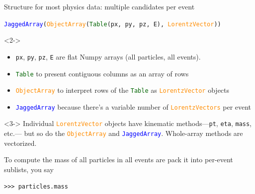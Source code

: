 \documentclass[aspectratio=169]{beamer}
\begin{document}
\begin{frame}[fragile]{Structure for most physics data: multiple candidates per event}
\vspace{0.4 cm}

\begin{center}
{\tt \small \textcolor{blue}{JaggedArray}(\textcolor{darkorange}{ObjectArray}(\textcolor{darkgreen}{Table}(px, py, pz, E), \textcolor{darkorange}{LorentzVector}))}
\end{center}

\begin{uncoverenv}<2->
\begin{itemize}
\item {\tt \small px}, {\tt \small py}, {\tt \small pz}, {\tt \small E} are flat Numpy arrays (all particles, all events).
\item \textcolor{darkgreen}{\tt \small Table} to present contiguous columns as an array of rows
\item \textcolor{darkorange}{\tt \small ObjectArray} to interpret rows of the \textcolor{darkgreen}{\tt \small Table} as \textcolor{darkorange}{\tt \small LorentzVector} objects
\item \textcolor{blue}{\tt \small JaggedArray} because there's a variable number of \textcolor{darkorange}{\tt \small LorentzVectors} per event
\end{itemize}
\end{uncoverenv}

\begin{uncoverenv}<3->
\vspace{0.35 cm}
Individual \textcolor{darkorange}{\tt \small LorentzVector} objects have kinematic methods---{\tt \small pt}, {\tt \small eta}, {\tt \small mass}, etc.--- but so do the \textcolor{darkorange}{\tt \small ObjectArray} and \textcolor{blue}{\tt \small JaggedArray}. Whole-array methods are vectorized.

\vspace{0.25 cm}
To compute the mass of all particles in all events are pack it into per-event sublists, you say

\small\begin{verbatim}
>>> particles.mass
\end{verbatim}
\end{uncoverenv}
\end{frame}
\end{document}
